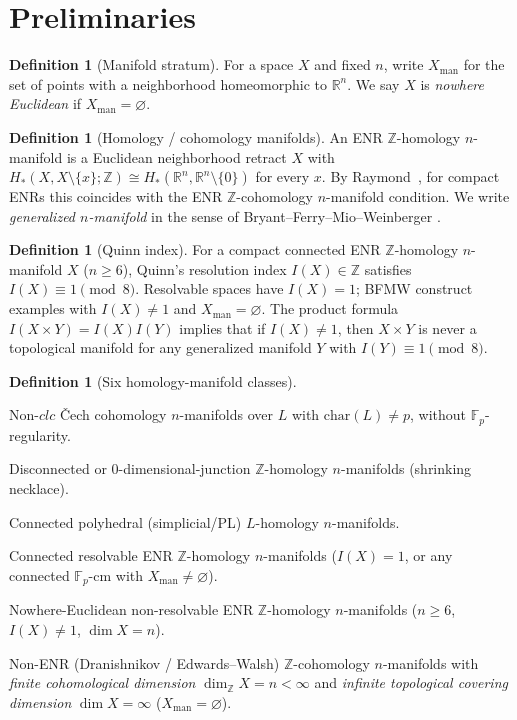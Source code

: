 \documentclass[11pt]{article}
\theoremstyle{definition}
\newtheorem{definition}[theorem]{Definition}
\begin{document}
\section{Preliminaries}
\label{sec:prelim}

\begin{definition}[Manifold stratum]
For a space $X$ and fixed $n$, write $X_{\mathrm{man}}$ for the set of points
with a neighborhood homeomorphic to $\mathbb{R}^n$.  We say $X$ is
\emph{nowhere Euclidean} if $X_{\mathrm{man}}=\varnothing$.
\end{definition}

\begin{definition}[Homology / cohomology manifolds]
An ENR $\mathbb{Z}$-homology $n$-manifold is a Euclidean neighborhood retract
$X$ with $H_*(X,X\setminus\{x\};\mathbb{Z})\cong H_*(\mathbb{R}^n,\mathbb{R}^n\setminus\{0\})$
for every $x$.  By Raymond~\cite{raymond1965}, for compact ENRs this coincides
with the ENR $\mathbb{Z}$-cohomology $n$-manifold condition.  We write
\emph{generalized $n$-manifold} in the sense of Bryant--Ferry--Mio--Weinberger
\cite{bfmw1996}.
\end{definition}

\begin{definition}[Quinn index]
For a compact connected ENR $\mathbb{Z}$-homology $n$-manifold $X$ ($n\ge 6$),
Quinn's resolution index $I(X)\in\mathbb{Z}$ satisfies
$I(X)\equiv 1\pmod{8}$.  Resolvable spaces have $I(X)=1$; BFMW construct
examples with $I(X)\neq 1$ and $X_{\mathrm{man}}=\varnothing$.
The product formula $I(X\times Y)=I(X)I(Y)$ implies that if $I(X)\neq 1$,
then $X\times Y$ is never a topological manifold for any generalized manifold
$Y$ with $I(Y)\equiv 1\pmod{8}$.
\end{definition}

\begin{definition}[Six homology-manifold classes]
\label{def:hm}
\begin{description}[style=nextline,leftmargin=1.2em]
\item[HM-1] Non-$clc$ \v{C}ech cohomology $n$-manifolds over $L$ with
$\mathrm{char}(L)\neq p$, without $\mathbb{F}_p$-regularity.
\item[HM-2] Disconnected or $0$-dimensional-junction $\mathbb{Z}$-homology
$n$-manifolds (shrinking necklace).
\item[HM-3] Connected polyhedral (simplicial/PL) $L$-homology $n$-manifolds.
\item[HM-4] Connected resolvable ENR $\mathbb{Z}$-homology $n$-manifolds
($I(X)=1$, or any connected $\mathbb{F}_p$-cm with $X_{\mathrm{man}}\neq\varnothing$).
\item[HM-5] Nowhere-Euclidean non-resolvable ENR $\mathbb{Z}$-homology
$n$-manifolds ($n\ge 6$, $I(X)\neq 1$, $\dim X=n$).
\item[HM-6] Non-ENR (Dranishnikov / Edwards--Walsh) $\mathbb{Z}$-cohomology
$n$-manifolds with \emph{finite cohomological dimension}
$\dim_{\mathbb{Z}}X=n<\infty$ and \emph{infinite topological covering dimension}
$\dim X=\infty$ ($X_{\mathrm{man}}=\varnothing$).
\end{description}
\end{definition}
\end{document}
